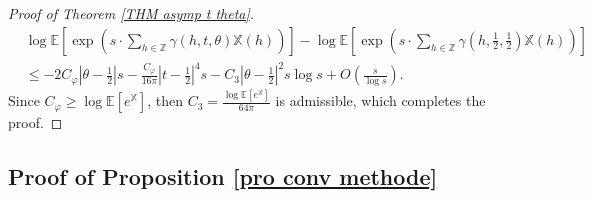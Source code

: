 \documentclass[12pt]{amsart}
\theoremstyle{definition}
\numberwithin{equation}{section}
\numberwithin{equation}{section}
\def\E{\mathbb{E}}
\def\Z{\mathbb{Z}}
\def\Mp{C_\varphi}
\def\X{\mathbb{X}}
\def\E{\mathbb{E}}
\begin{document}
\begin{proof}[Proof of Theorem \ref{THM asymp t theta}]
 \begin{align*}
&\log \E \left[\exp \left(s \cdot \sum_{h\in \Z} \gamma(h,t,\theta)\X(h)\right) \right] 
    -  \log \E \left[\exp \left(s \cdot \sum_{h\in \Z} \gamma\left(h,\frac{1}{2},\frac{1}{2}\right)\X(h)\right)\right]\\
    &\leq -2\Mp \left|\theta-\frac{1}{2}\right| s
     -\frac{\Mp }{16 \pi}\left|t-\frac{1}{2}\right|^4 s -C_3 \left|\theta-\frac{1}{2}\right|^2 s\log s
     +O\left(\frac{s}{\log s}\right).
\end{align*} 
Since $\Mp \geq \log\E\left[e^\X\right]$, then $C_3 = \frac{\log\E\left[e^\X\right]}{64\pi}$ is admissible, which completes the proof.
\end{proof}








\subsection{Proof of Proposition \ref{pro conv methode}}
\end{document}
